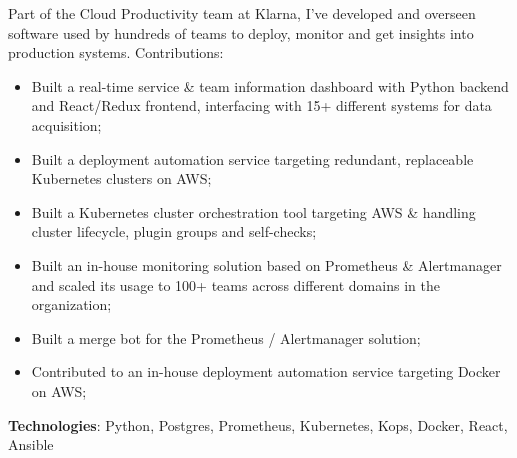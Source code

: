 \documentclass[12pt,legalpaper,sans]{moderncv}        %
\begin{document}
    {\begin{minipage}[t]{\linewidth}\small{Part of the Cloud Productivity team at Klarna, I've developed and overseen software used by hundreds of teams to deploy, monitor and get insights into production systems.\newline{}
    Contributions:
        \begin{itemize}
            \item Built a real-time service \& team information dashboard with Python backend and React/Redux frontend, interfacing with 15+ different systems for data acquisition;
            \item Built a deployment automation service targeting redundant, replaceable Kubernetes clusters on AWS;
            \item Built a Kubernetes cluster orchestration tool targeting AWS \& handling cluster lifecycle, plugin groups and self-checks;
            \item Built an in-house monitoring solution based on Prometheus \& Alertmanager and scaled its usage to 100+ teams across different domains in the organization;
            \item Built a merge bot for the Prometheus / Alertmanager solution;
            \item Contributed to an in-house deployment automation service targeting Docker on AWS;
        \end{itemize}
        \textbf{Technologies}: Python, Postgres, Prometheus, Kubernetes, Kops, Docker, React, Ansible\newline}\end{minipage}}
\end{document}
